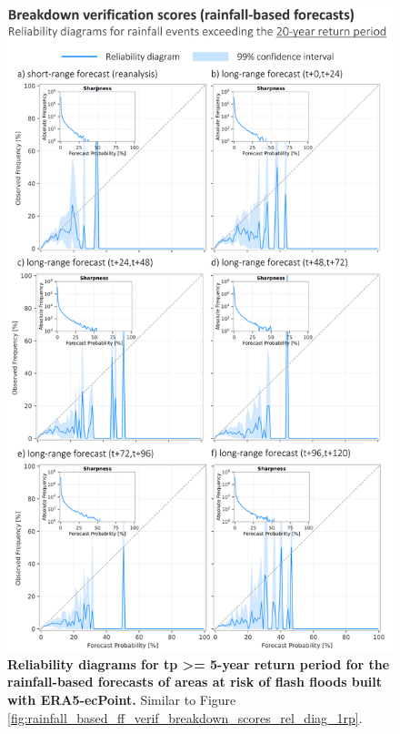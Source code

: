 \begin{figure}[htbp]
\centering
\includegraphics[width=\textwidth]{rainfall_based_ff_verif_breakdown_scores_rel_diag_20rp.png}
\caption{\textbf{Reliability diagrams for tp >= 5-year return period for the rainfall-based forecasts of areas at risk of flash floods built with ERA5-ecPoint.} Similar to Figure \ref{fig:rainfall_based_ff_verif_breakdown_scores_rel_diag_1rp}.}
\label{fig:rainfall_based_ff_verif_breakdown_scores_rel_diag_20rp}
\end{figure}

